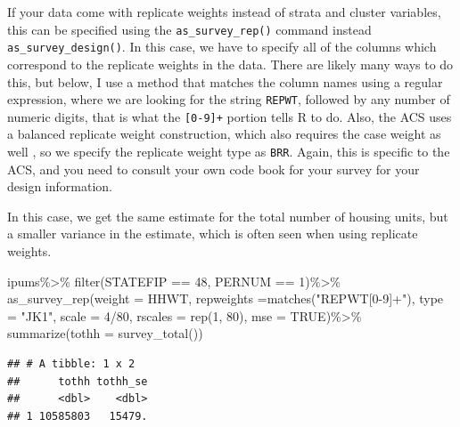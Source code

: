 \documentclass[
]{article}
\newenvironment{Shaded}{\begin{snugshade}}{\end{snugshade}}
\newcommand{\AttributeTok}[1]{\textcolor[rgb]{0.77,0.63,0.00}{#1}}
\newcommand{\ConstantTok}[1]{\textcolor[rgb]{0.00,0.00,0.00}{#1}}
\newcommand{\DecValTok}[1]{\textcolor[rgb]{0.00,0.00,0.81}{#1}}
\newcommand{\FunctionTok}[1]{\textcolor[rgb]{0.00,0.00,0.00}{#1}}
\newcommand{\NormalTok}[1]{#1}
\newcommand{\SpecialCharTok}[1]{\textcolor[rgb]{0.00,0.00,0.00}{#1}}
\newcommand{\StringTok}[1]{\textcolor[rgb]{0.31,0.60,0.02}{#1}}
\begin{document}
If your data come with replicate weights instead of strata and cluster variables, this can be specified using the \texttt{as\_survey\_rep()} command instead \texttt{as\_survey\_design()}. In this case, we have to specify all of the columns which correspond to the replicate weights in the data. There are likely many ways to do this, but below, I use a method that matches the column names using a regular expression, where we are looking for the string \texttt{REPWT}, followed by any number of numeric digits, that is what the \texttt{{[}0-9{]}+} portion tells R to do. Also, the ACS uses a balanced replicate weight construction, which also requires the case weight as well \citep{Ruggles2021}, so we specify the replicate weight type as \texttt{BRR}. Again, this is specific to the ACS, and you need to consult your own code book for your survey for your design information.

In this case, we get the same estimate for the total number of housing units, but a smaller variance in the estimate, which is often seen when using replicate weights.

\begin{Shaded}
\begin{Highlighting}[]
\NormalTok{ipums}\SpecialCharTok{\%\textgreater{}\%}
  \FunctionTok{filter}\NormalTok{(STATEFIP }\SpecialCharTok{==} \DecValTok{48}\NormalTok{, PERNUM }\SpecialCharTok{==} \DecValTok{1}\NormalTok{)}\SpecialCharTok{\%\textgreater{}\%}
  \FunctionTok{as\_survey\_rep}\NormalTok{(}\AttributeTok{weight =}\NormalTok{ HHWT,}
            \AttributeTok{repweights =}\FunctionTok{matches}\NormalTok{(}\StringTok{"REPWT[0{-}9]+"}\NormalTok{),}
            \AttributeTok{type =} \StringTok{"JK1"}\NormalTok{,}
            \AttributeTok{scale =} \DecValTok{4}\SpecialCharTok{/}\DecValTok{80}\NormalTok{,}
            \AttributeTok{rscales =} \FunctionTok{rep}\NormalTok{(}\DecValTok{1}\NormalTok{, }\DecValTok{80}\NormalTok{),}
            \AttributeTok{mse =} \ConstantTok{TRUE}\NormalTok{)}\SpecialCharTok{\%\textgreater{}\%}
  \FunctionTok{summarize}\NormalTok{(}\AttributeTok{tothh =} \FunctionTok{survey\_total}\NormalTok{())}
\end{Highlighting}
\end{Shaded}

\begin{verbatim}
## # A tibble: 1 x 2
##      tothh tothh_se
##      <dbl>    <dbl>
## 1 10585803   15479.
\end{verbatim}
\end{document}
